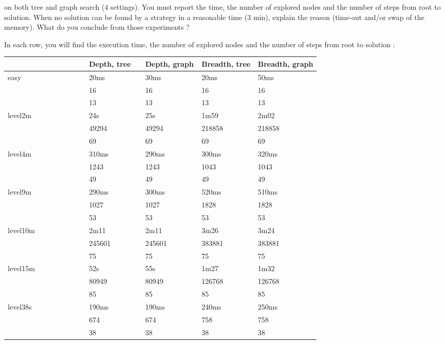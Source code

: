 \begin{enumerate}
        on both tree and graph search (4 settings). You must report the
        time, the number of explored nodes and the number of steps from
        root to solution. When no solution can be found by a strategy in
        a reasonable time (3 min), explain the reason (time-out and/or
        swap of the memory). What do you conclude from those experiments
        ?
	\begin{framed}
        In each row, you will find the execution time, the number of
        explored nodes and the number of steps from root to solution :
	  \begin{tabular}{l|p{0.18\linewidth}|p{0.18\linewidth}|p{0.18\linewidth}|p{0.2\linewidth}}
			& Depth, tree 		& Depth, graph 		& Breadth, tree 	& Breadth, graph \\
	    \hline
	    \hline
	    easy 	& 20ms			& 30ms 			& 20ms			& 50ms	 		\\
			& 16			& 16			& 16			& 16			\\
			& 13			& 13			& 13			& 13			\\
	    \hline
	    level2m 	& 24s	 		& 25s			& 1m59			& 2m02		 	\\
			& 49294			& 49294			& 218858		& 218858		\\
			& 69			& 69			& 69			& 69			\\
	    \hline
	    level4m 	& 310ms		  	& 290ms			& 300ms			& 320ms		 	\\
			& 1243			& 1243			& 1043			& 1043			\\
			& 49			& 49			& 49			& 49			\\
	    \hline
	    level9m 	& 290ms			& 300ms			& 520ms			& 510ms		 	\\
			& 1027			& 1027			& 1828			& 1828			\\
			& 53			& 53			& 53			& 53			\\
	    \hline
	    level10m 	& 2m11			& 2m11			& 3m26			& 3m24		 	\\
			& 245601		& 245601		& 383881		& 383881		\\
			& 75			& 75			& 75			& 75			\\
	    \hline
	    level15m 	& 52s			& 55s			& 1m27			& 1m32		 	\\
			& 80949			& 80949			& 126768		& 126768		\\
			& 85			& 85			& 85			& 85			\\
	    \hline
	    level38s 	& 190ms			& 190ms			& 240ms			& 250ms		 	\\
			& 674			& 674			& 758			& 758			\\
			& 38			& 38			& 38			& 38			\\

\end{tabular}
\end{framed}
\end{enumerate}
